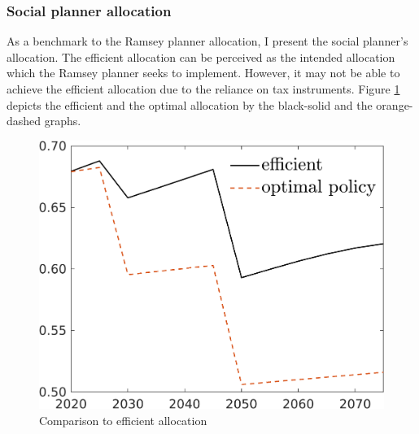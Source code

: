 \subsubsection{Social planner allocation}
As a benchmark to the Ramsey planner allocation, I present the social planner's allocation. The efficient allocation can be perceived as the intended allocation which the Ramsey planner seeks to implement. However, it may not be able to achieve the efficient allocation due to the reliance on tax instruments. Figure \ref{fig:fb_opt} depicts the efficient and the optimal allocation by the black-solid and the orange-dashed graphs. 
\begin{figure}[h!!]
	\centering
	\caption{Comparison to efficient allocation }\label{fig:fb_opt}
	
	\begin{minipage}[]{0.32\textwidth}
		\includegraphics[width=1\textwidth]{../../codding_model/own_basedOnFried/optimalPol_190722_tidiedUp/figures/all_July22/C_CompEffOPT_T_NoTaus_regime3_opteff_spillover0_noskill0_sep1_xgrowth0_countec0_etaa0.79_lgd1_lff0.png}
	\end{minipage}
	\begin{minipage}[]{0.32\textwidth}

\end{minipage}
\end{figure}
